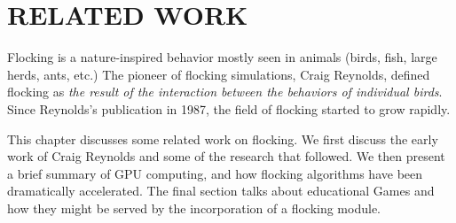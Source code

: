 \chapter{RELATED WORK}\label{chap2}


Flocking is a nature-inspired behavior mostly seen in animals (birds, fish, large herds, ants, etc.) The pioneer of flocking simulations, Craig Reynolds, defined flocking as \textit{the result of the interaction between the behaviors of individual birds}\cite{craig1}. Since Reynolds's publication in 1987, the field of flocking started to grow rapidly. %

This chapter discusses some related work on flocking. We first discuss the early work of Craig Reynolds and some of the research that followed. We then present a brief summary of GPU computing, and how flocking algorithms have been dramatically accelerated. The final section talks about educational Games and how they might be served by the incorporation of a flocking module. 





